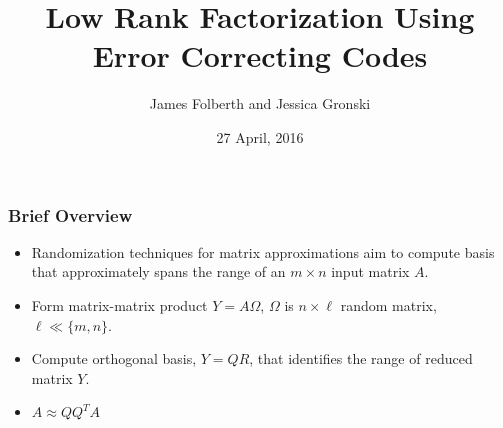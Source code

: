 \documentclass[9pt]{beamer}
\begin{document}
\title{Low Rank Factorization Using Error Correcting Codes}
\author[]{James Folberth and Jessica Gronski }
\date{27 April, 2016}

\begin{frame}
\titlepage
\end{frame}

\begin{frame}
\frametitle{Brief Overview}
\begin{itemize}
\item Randomization techniques for matrix approximations aim to compute basis that approximately spans the range of an $ m \times n$ input matrix $A$.
\vspace{4mm}

\item Form matrix-matrix product $Y = A \Omega$, $\Omega$ is $n \times \ell$ random matrix, $\ell \ll \{m,n\}$.
\vspace{4mm}

\item Compute orthogonal basis, $Y = QR$, that identifies the range of reduced matrix $Y$.
\vspace{4mm}

\item $A \approx QQ^T A$

\end{itemize}
\end{frame}
\end{document}
